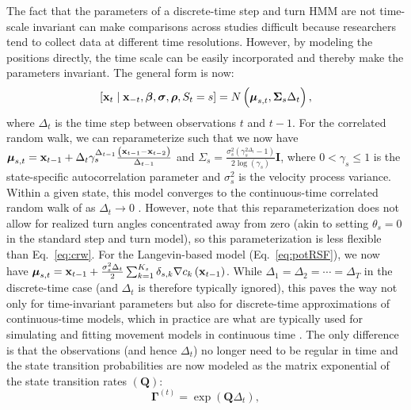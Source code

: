 \documentclass[12pt]{article}\usepackage[]{graphicx}\usepackage[]{xcolor}
\begin{document}
The fact that the parameters of a discrete-time step and turn HMM are not time-scale invariant can make comparisons across studies difficult because researchers tend to collect data at different time resolutions. However, by modeling the positions directly, the time scale can be easily incorporated and thereby make the parameters invariant. The general form is now:
\begin{equation}
\label{eq:disApprox}
    [{\bf x}_t \mid {\bf x}_{-t}, \boldsymbol{\beta}, {\boldsymbol \sigma}, {\boldsymbol \rho}, S_t=s] = N\left(\boldsymbol{\mu}_{s,t},{\boldsymbol \Sigma}_s \Delta_t \right),
\end{equation}
where $\Delta_t$ is the time step between observations $t$ and $t-1$. For the correlated random walk, we can reparameterize such that we now have $\boldsymbol{\mu}_{s,t}={\bf x}_{t-1}+\Delta_t \gamma_s^{\Delta_{t-1}} \frac{\left({\bf x}_{t-1}-{\bf x}_{t-2}\right)}{\Delta_{t-1}}$ and $\Sigma_s=\frac{\sigma^2_s \left(\gamma_s^{2 \Delta_t}-1\right)}{2 \log \left(\gamma_s\right)} \mathbf{I}$, where $0 < \gamma_s \leq 1$ is the state-specific autocorrelation parameter and $\sigma_s^2$ is the velocity process variance. Within a given state, this model converges to the continuous-time correlated random walk of \cite{JohnsonEtAl2008} as $\Delta_t \to 0$ \citep[e.g.,][]{albertsen2019generalizing}. However, note that this reparameterization does not allow for realized turn angles concentrated away from zero (akin to setting $\theta_s=0$ in the standard step and turn model), so this parameterization is less flexible than Eq.\ \ref{eq:crw}. For the Langevin-based model (Eq.\ \ref{eq:potRSF}), we now have ${\boldsymbol \mu}_{s,t} = {\bf x}_{t-1} + \frac{\sigma_s^2 \Delta_t}{2} \sum_{k=1}^{K_s} \delta_{s,k} \nabla c_k\left({\bf x}_{t-1}\right)$. While $\Delta_1 = \Delta_2 = \cdots = \Delta_T$ in the discrete-time case (and $\Delta_t$ is therefore typically ignored), this paves the way not only for time-invariant parameters but also for discrete-time approximations of continuous-time models, which in practice are what are typically used for simulating and fitting movement models in continuous time \citep[e.g.,][]{HootenEtAl2017,HootenEtAl2019,MichelotEtAl2019}. The only difference is that the observations (and hence $\Delta_t$) no longer need to be regular in time and the state transition probabilities are now modeled as the matrix exponential of the state transition rates $\left(\mathbf{Q}\right)$: 
\begin{equation}
  \boldsymbol{\Gamma}^{(t)} = \exp \left(\mathbf{Q} \Delta_t \right),
\end{equation}
\end{document}
